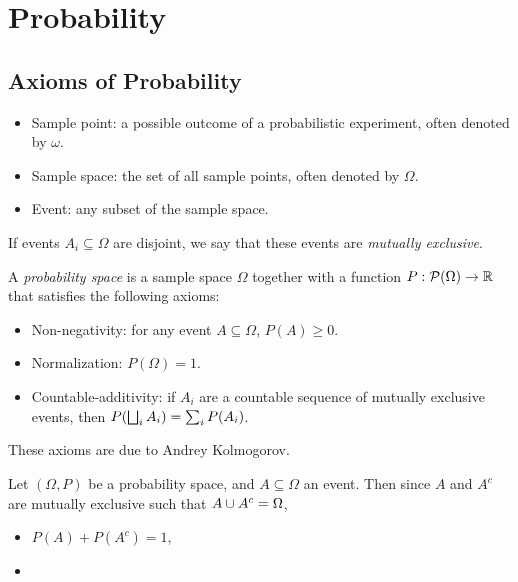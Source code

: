 \chapter{Probability}
\label{ch:probability}

\section{Axioms of Probability}

\begin{defn}\proofbreak
    \begin{itemize}
        \item Sample point: a possible outcome of a probabilistic experiment, often denoted by $\omega$.
        \item Sample space: the set of all sample points, often denoted by $\Omega$.
        \item Event: any subset of the sample space.
    \end{itemize}
\end{defn}

\begin{defn}
    If events $A_i \subseteq \Omega$ are disjoint, we say that these events are \emph{mutually exclusive}.
\end{defn}

\begin{defn}\label{kolmogorov-probability-axioms}
    A \emph{probability space} is a sample space $\Omega$ together with a function $P: \mathcal{P}(\Omega) \to \mathbb{R}$ that satisfies the following axioms:
    \begin{itemize}
        \item Non-negativity: for any event $A \subseteq \Omega$, $P(A) \geq 0$.
        \item Normalization: $P(\Omega) = 1$.
        \item Countable-additivity: if $A_i$ are a countable sequence of mutually exclusive events, then $P(\bigsqcup_{i}A_i) = \sum_{i}P(A_i)$.
    \end{itemize}
\end{defn}

\begin{rmk}
    These axioms are due to Andrey Kolmogorov.
\end{rmk}

\begin{prop}
    Let $(\Omega, P)$ be a probability space, and $A \subseteq \Omega$ an event. Then since $A$ and $A^{c}$ are mutually exclusive such that $A \cup A^{c} = \Omega$,
    \begin{itemize}
        \item $P(A) + P(A^{c}) = 1$,
        \item
    \end{itemize}
\end{prop}

